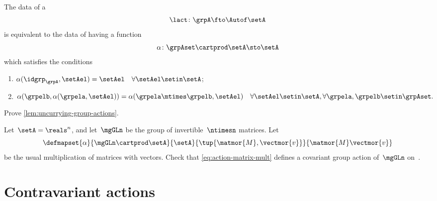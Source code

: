 \begin{lemma}
    \label{lem:uncurrying-group-actions}
    The data of a 
    \begin{equation}
        \lact \colon \grpA \fto \Autof\setA
    \end{equation}
    is equivalent to the data of having a function
    \begin{equation}
        \alpha \colon \grpAset \cartprod \setA \sto \setA
    \end{equation}
    which satisfies the conditions
    \begin{enumerate}
        \item $ \alpha (\idgrp_\grpA, \setAel) = \setAel \quad \forall \setAel \setin \setA$;
        \item $ \alpha (\grpelb, \alpha(\grpela, \setAel)) = \alpha (\grpela \mtimes \grpelb, \setAel) \quad \forall \setAel \setin \setA, \forall \grpela, \grpelb \setin \grpAset.
              $
    \end{enumerate}
\end{lemma}

\vfill%


\begin{gradedexercise}
    \label{ex:UncurryingGroupActions}
    Prove \cref{lem:uncurrying-group-actions}.
\end{gradedexercise}

\begin{gradedexercise}
    \label{ex:MatrixMultAction}
    Let~$\setA = \reals^n$, and let~$\mgGLn$ be the group of invertible~$\ntimesn$ matrices.
    Let
    \begin{equation}
        \label{eq:action-matrix-mult}
        \defmapset{
            \alpha
        }{
            \mgGLn \cartprod \setA
        }{
            \setA
        }{
            \tup{\matmor{M}, \vectmor{v}}
        }{
            \matmor{M}\vectmor{v}
        }
    \end{equation}
    be the usual multiplication of matrices with vectors.
    Check that \cref{eq:action-matrix-mult} defines a covariant group action of~$\mgGLn$ on~\setA.
\end{gradedexercise}


\section{Contravariant actions}

